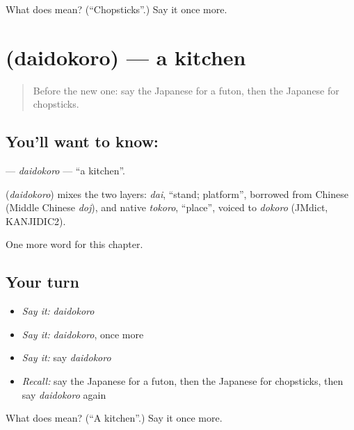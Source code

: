 \begin{tcolorbox}[breakable,colback=teal!4,colframe=teal!35!black,title={Before you move on}]
What does  mean? (\textquotedblleft{}Chopsticks\textquotedblright{}.) Say it once more.
\end{tcolorbox}
\section[\texorpdfstring{\ja{だいどころ} (daidokoro)}{だいどころ (daidokoro)}]{ (daidokoro) — a kitchen}

\label{lesson:JA-C38-daidokoro}



\begin{quote}
Before the new one: say the Japanese for a futon, then the Japanese for chopsticks.
\end{quote}

\subsection*{You'll want to know: }
\textbf{} — \emph{daidokoro} — \textquotedblleft{}a kitchen\textquotedblright{}.

\begin{cousinweb}
\textbf{} (\emph{daidokoro}) mixes the two layers: \emph{dai}, \textquotedblleft{}stand; platform\textquotedblright{}, borrowed from Chinese (Middle Chinese \emph{doj}), and native \emph{tokoro}, \textquotedblleft{}place\textquotedblright{}, voiced to \emph{dokoro} (JMdict, KANJIDIC2).
\end{cousinweb}

\begin{grammarlens}[title={What you've built}]
One more word for this chapter.
\end{grammarlens}

\subsection*{Your turn}
\begin{itemize}
\raggedright
  \item \emph{Say it:} \emph{daidokoro}
  \item \emph{Say it:} \emph{daidokoro}, once more
  \item \emph{Say it:} say \emph{daidokoro}
  \item \emph{Recall:} say the Japanese for a futon, then the Japanese for chopsticks, then say \emph{daidokoro} again
\end{itemize}

\begin{tcolorbox}[breakable,colback=teal!4,colframe=teal!35!black,title={Before you move on}]
What does  mean? (\textquotedblleft{}A kitchen\textquotedblright{}.) Say it once more.
\end{tcolorbox}
